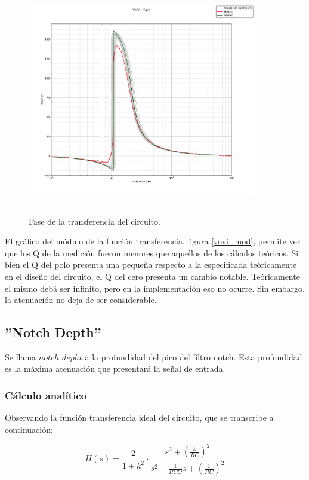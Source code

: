 \begin{figure}[H] %
	\centering
	\includegraphics[width=10cm,height=10cm,keepaspectratio]{../EJ1/00GRAFICOS/vovifase.jpg}
	\caption{Fase de la transferencia del circuito.}
	\label{vovi_fase}
\end{figure}

El gr\'afico del m\'odulo de la funci\'on transferencia, figura \ref{vovi_mod}, permite ver que los Q de la medici\'on fueron menores que aquellos de los c\'alculos te\'oricos. Si bien el Q del polo presenta una peque\~na respecto a la especificada te\'oricamente en el dise\~no del circuito, el Q del cero presenta un cambio notable. Te\'oricamente el mismo deb\'a ser infinito, pero en la implementaci\'on eso no ocurre. Sin embargo, la atenuaci\'on no deja de ser considerable.


\subsection{ ''Notch Depth''}

Se llama $notch$  $depht$ a la profundidad del pico del filtro notch. Esta profundidad es la m\'axima atenuaci\'on que presentar\'a la se\~nal de entrada.

\subsubsection{C\'alculo anal\'itico} 
Observando la funci\'on transferencia ideal del circuito, que se transcribe a continuaci\'on:

\begin{equation}
H(s) = \frac{2}{1+k^2} \cdot \frac{s^2 + \left( \frac{k}{RC}\right)^2}{s^2 + \frac{1}{RCQ} s + \left(\frac{1}{RC}\right)^2}
\label{vovi_simple2}
\end{equation}

